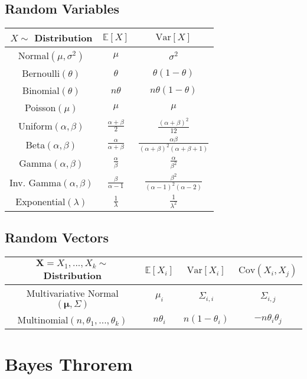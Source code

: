 \documentclass[12pt]{article}
\theoremstyle{definition}
\newcommand{\Expect}[1]{\mathbb{E}\left[#1\right]}
\newcommand{\Var}[1]{\text{Var}\left[#1\right]}
\newcommand{\Cov}[1]{\text{Cov}\left(#1\right)}
\begin{document}
    \subsection*{Random Variables}
    \begin{tabular}{|c|c|c|}
        \hline
        $X \sim$ Distribution & $\Expect{X}$ & $\Var{X}$\\
        \hline
        Normal$(\mu, \sigma^2)$ & $\mu$ & $\sigma^2$\\
        \hline
        Bernoulli$(\theta)$ & $\theta$ & $\theta(1-\theta)$\\
        \hline
        Binomial$(\theta)$ & $n\theta$ & $n\theta(1-\theta)$\\
        \hline
        Poisson$(\mu)$ & $\mu$ & $\mu$\\
        \hline
        Uniform$(\alpha, \beta)$ & $\frac{\alpha + \beta}{2}$ & $\frac{(\alpha + \beta)^2}{12}$\\
        \hline
        Beta$(\alpha, \beta)$ & $\frac{\alpha}{\alpha + \beta}$ & $\frac{\alpha\beta}{(\alpha + \beta)^2(\alpha + \beta+1)}$\\
        \hline
        Gamma$(\alpha, \beta)$ & $\frac{\alpha}{\beta}$ & $\frac{\alpha}{\beta^2}$\\
        \hline
        Inv. Gamma$(\alpha, \beta)$ & $\frac{\beta}{\alpha -1}$ & $\frac{\beta^2}{(\alpha-1)^2(\alpha -2)}$\\
        \hline
        Exponential$(\lambda)$ & $\frac{1}{\lambda}$ & $\frac{1}{\lambda^2}$\\
        \hline
    \end{tabular}
    \subsection*{Random Vectors}
    \begin{tabular}{|c|c|c|c|}
        \hline
        $\mathbf{X} = X_1,...,X_k \sim$ Distribution & $\Expect{X_i}$ & $\Var{X_i}$ & $\Cov{X_i,X_j}$\\
        \hline
        Multivariative Normal$(\bm{\mu}, \Sigma)$ & $\mu_i$ & $\Sigma_{i,i}$ & $\Sigma_{i,j}$\\
        \hline
        Multinomial$(n,\theta_1,...,\theta_k)$ & $n\theta_i$ & $n(1-\theta_i)$ & $-n\theta_i\theta_j$\\
        \hline
    \end{tabular}


\pagebreak
\section{Bayes Throrem}
\end{document}
